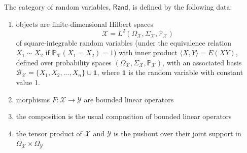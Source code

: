 \documentclass[sigconf]{acmart}
\newcommand{\Cat}[1]{\mathsf{#1}}
\def\Rand{\Cat{Rand}}
\def\Cor{\textnormal{Cor}}
\def\One{\textbf{1}}
\begin{document}
\begin{definition}
The category of random variables, $\Rand$, is defined by the following data:
\begin{enumerate}
\item objects are finite-dimensional Hilbert spaces \[ \mathcal{X} = L^2(\Omega_\mathcal{X}, \Sigma_\mathcal{X}, \mathbb{P}_\mathcal{X})\] of square-integrable random variables (under the equivalence relation $X_1 \sim X_2$ if $\mathbb{P}_\mathcal{X}(X_1 = X_2) = 1$) with inner product $\langle X,Y\rangle = E(XY)$, defined over probability spaces $(\Omega_\mathcal{X}, \Sigma_\mathcal{X}, \mathbb{P}_\mathcal{X})$, with an associated basis $\mathcal{B}_\mathcal{X} = \{ X_1, X_2, ..., X_n \} \cup \One$, where $\One$ is the random variable with constant value 1. %
\item morphisms $F: \mathcal{X} \to \mathcal{Y}$ are bounded linear operators
\item the composition is the usual composition of bounded linear operators
\item the tensor product of $\mathcal{X}$ and $\mathcal{Y}$ is the pushout over their joint support in $\Omega_\mathcal{X} \times \Omega_\mathcal{Y}$




\end{enumerate}
\end{definition}
\end{document}
